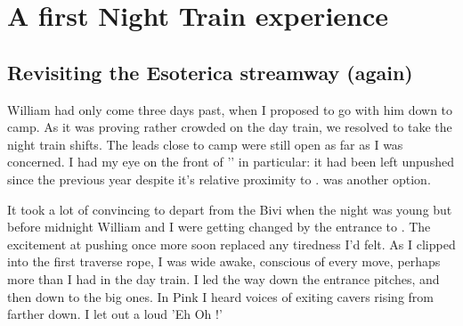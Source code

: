 \section{A first Night Train experience}
\begin{marginfigure}
\end{marginfigure}

\subsection{Revisiting the Esoterica streamway (again)}
William had only come three days past, when I proposed to go with him down to camp. As it was proving rather crowded on the day train, we resolved to take the night train shifts. The leads close to camp were still open as far as I was concerned. I had my eye on the front of '' in particular: it had been left unpushed since the previous year despite it's relative proximity to .  was another option. 

It took a lot of convincing to depart from the Bivi when the night was young but before midnight William and I were getting changed by the entrance to . The excitement at pushing once more soon replaced any tiredness I'd felt. As I clipped into the first traverse rope, I was wide awake, conscious of every move, perhaps more than I had in the day train. I led the way down the entrance pitches, and then down to the big ones. In Pink I heard voices of exiting cavers rising from farther down. I let out a loud 'Eh Oh !'

